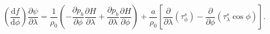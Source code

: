 \begin{equation}
    \left(\frac{\text{d}f}{\text{d}\phi}\right)\frac{\partial \psi}{\partial\lambda} = \frac{1}{\rho_0}\left(-\frac{\partial p_b}{\partial\phi}\frac{\partial H}{\partial\lambda} + \frac{\partial p_b}{\partial\lambda}\frac{\partial H}{\partial\phi}\right)
    + \frac{a}{\rho_0}\left[\frac{\partial}{\partial\lambda}\left(\tau_\phi^s\right)-\frac{\partial}{\partial\phi}\left(\tau_\lambda^s\cos\phi\right)\right].
\label{EQN:CrossDifferentialVInt}
\end{equation}
